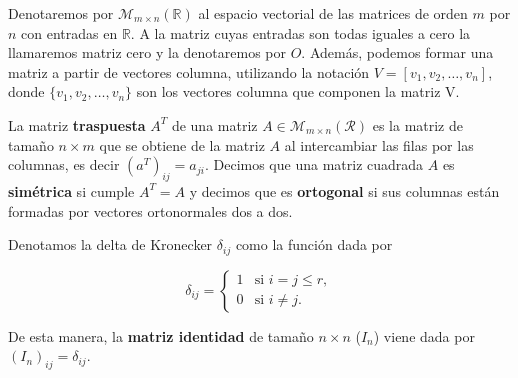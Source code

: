 Denotaremos por $\mathcal{M}_{m \times n}(\mathbb{R})$ al espacio vectorial de las matrices de orden $m$ por $n$ con entradas en $\mathbb{R}$. A la matriz cuyas entradas son todas iguales a cero la llamaremos matriz cero y la denotaremos por $O$. Además, podemos formar una matriz a partir de vectores columna, utilizando la notación $V = [v_1, v_2, \ldots, v_n]$, donde $\{v_1, v_2, \ldots, v_n\}$ son los vectores columna que componen la matriz V.\newline

\begin{definicion}
    La matriz \textbf{traspuesta} $A^{T}$ de una matriz $A \in \mathcal{M}_{m \times n}(\mathcal{R})$ es la matriz de tamaño $n \times m$ que se obtiene de la matriz $A$ al intercambiar las filas por las columnas, es decir $(a^{T})_{ij} = a_{ji}$. Decimos que una matriz cuadrada $A$ es \textbf{simétrica} si cumple $A^{T} = A$ y decimos que es \textbf{ortogonal} si sus columnas están formadas por vectores ortonormales dos a dos.\newline
\end{definicion}

Denotamos la delta de Kronecker $\delta_{ij}$ como la función dada por

\[
    \delta_{ij} =
    \begin{cases}
        1 & \text{si } i = j \leq r, \\
        0 & \text{si } i \neq j.
    \end{cases}
\]

De esta manera, la \textbf{matriz identidad} de tamaño $n \times n$ ($I_{n}$) viene dada por $(I_n)_{ij} = \delta_{ij}$.\newline

